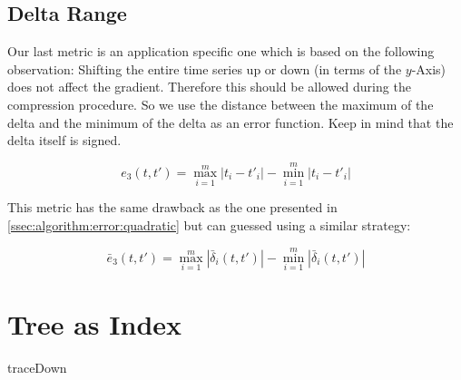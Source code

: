 \subsection{Delta Range}
\label{ssec:algorithm:error:range}

Our last metric is an application specific one which is based on the following observation: Shifting the entire time series up or down (in terms of the $y$-Axis) does not affect the gradient. Therefore this should be allowed during the compression procedure. So we use the distance between the maximum of the delta and the minimum of the delta as an error function. Keep in mind that the delta itself is signed.

\begin{equation}\label{eq:e3}
    e_3\left(t, t'\right) = \max_{i=1}^m \left|t_i - t'_i\right| - \min_{i=1}^m \left|t_i - t'_i\right|
\end{equation}

This metric has the same drawback as the one presented in \autoref{ssec:algorithm:error:quadratic} but can guessed using a similar strategy:

\begin{equation}\label{eq:e3_up}
    \bar{e}_3\left(t, t'\right) = \max_{i=1}^m \left|\bar{\delta}_i(t, t')\right| - \min_{i=1}^m \left|\bar{\delta}_i(t, t')\right|
\end{equation}



\section{Tree as Index}
\label{sec:algorithm:asindex}

\begin{algorithm}



    \caption{traceDown}\label{algo:traceDown}
\end{algorithm}

